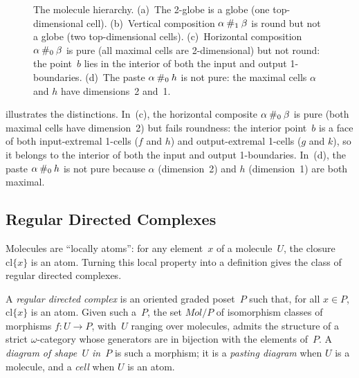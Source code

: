\documentclass[acmsmall,screen,nonacm]{acmart}
\begin{document}
\begin{figure}[t]
\caption{The molecule hierarchy.  (a)~The 2-globe is a globe (one
  top-dimensional cell).  (b)~Vertical composition $\alpha \mathbin{\#_{1}}
  \beta$ is round but not a globe (two top-dimensional cells).
  (c)~Horizontal composition $\alpha \mathbin{\#_{0}} \beta$ is pure (all
  maximal cells are 2-dimensional) but not round: the point~$b$ lies
  in the interior of both the input and output 1-boundaries.
  (d)~The paste $\alpha \mathbin{\#_{0}} h$ is not pure: the maximal cells
  $\alpha$ and $h$ have dimensions~2 and~1.}
\label{fig:molecules:hierarchy}
\end{figure}

 illustrates the distinctions.  In~(c),
the horizontal composite $\alpha \mathbin{\#_{0}} \beta$ is pure (both maximal
cells have dimension~2) but fails roundness: the interior point~$b$ is a
face of both input-extremal 1-cells ($f$ and $h$) and output-extremal
1-cells ($g$ and $k$), so it belongs to the interior of both the input
and output 1-boundaries.  In~(d), the paste $\alpha \mathbin{\#_{0}} h$ is not
pure because $\alpha$ (dimension~2) and $h$ (dimension~1) are both
maximal.

\subsection{Regular Directed Complexes}
\label{sec:molecules:regular}

Molecules are ``locally atoms'': for any element~$x$ of a molecule~$U$,
the closure $\mathrm{cl}\{x\}$ is an atom.  Turning this local property
into a definition gives the class of regular directed complexes.

A \emph{regular directed complex} is an oriented graded poset~$P$ such
that, for all $x \in P$, $\mathrm{cl}\{x\}$ is an atom.  Given such
a~$P$, the set $\mathit{Mol}/P$ of isomorphism classes of morphisms
$f \colon U \to P$, with~$U$ ranging over molecules, admits the
structure of a strict $\omega$-category whose generators are in
bijection with the elements of~$P$.  A \emph{diagram of shape~$U$
in~$P$} is such a morphism; it is a \emph{pasting diagram} when $U$ is
a molecule, and a \emph{cell} when $U$ is an atom.
\end{document}
